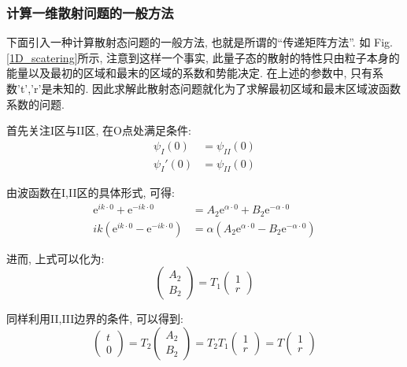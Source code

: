 \documentclass[a4paper, 11pt]{article}
\begin{document}
\begin{spacing}{1.2}
        \subsubsection{计算一维散射问题的一般方法}
          下面引入一种计算散射态问题的一般方法, 也就是所谓的``传递矩阵方法''. 如 Fig.\ref{1D_scatering}所示,
          注意到这样一个事实, 此量子态的散射的特性只由粒子本身的能量以及最初的区域和最末的区域的系数和势能决定.
          在上述的参数中, 只有系数't','r'是未知的. 因此求解此散射态问题就化为了求解最初区域和最末区域波函数
          系数的问题. 
          
          首先关注I区与II区, 在O点处满足条件:
          \begin{equation}
            \begin{aligned}
              \psi_I(0) &= \psi_{II}(0)\\
              \psi_I'(0) &= \psi_{II}(0) 
            \end{aligned}
          \end{equation}

          由波函数在I,II区的具体形式, 可得:
          \begin{equation}
            \begin{aligned}
              \mathrm{e}^{ik\cdot0} + \mathrm{e}^{-ik\cdot0} &= %
                      A_2\mathrm{e}^{\alpha\cdot0} + B_2\mathrm{e}^{-\alpha\cdot0}\\
              ik(\mathrm{e}^{ik\cdot0} - \mathrm{e}^{-ik\cdot0}) &= %
                      \alpha(A_2\mathrm{e}^{\alpha\cdot0} - B_2\mathrm{e}^{-\alpha\cdot0})
            \end{aligned}
          \end{equation}
          
          进而, 上式可以化为:
          \begin{equation}
            \left(\begin{array}{c}A_2\\B_2\end{array} \right) = %
            T_1\left(\begin{array}{c}1\\r\end{array} \right)%
          \end{equation}
          
          同样利用II,III边界的条件, 可以得到:
          \begin{equation}
            \left(\begin{array}{c}t\\0\end{array} \right) = %
            T_2\left(\begin{array}{c}A_2\\B_2\end{array}\right) = %
            T_2T_1\left(\begin{array}{c}1\\r\end{array}\right) = %
            T\left(\begin{array}{c}1\\r\end{array}\right)
          \end{equation}


\end{spacing}
\end{document}
